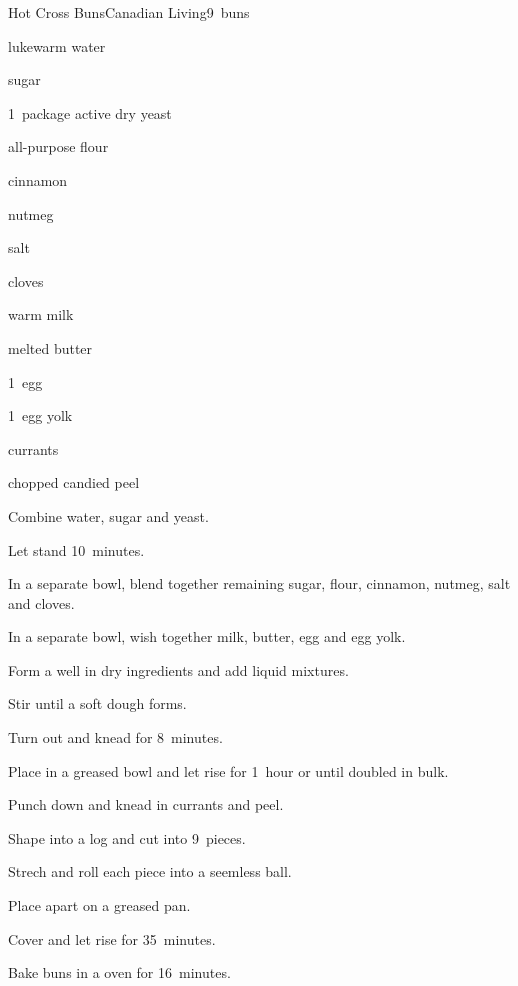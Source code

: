 \begin{recipe}{Hot Cross Buns}{Canadian Living}{9~buns}

\begin{ingredients}
\item \C{\quarter} lukewarm water
\item \C{\half} sugar
\item 1~package active dry yeast
\item \C{3\half} all-purpose flour
\item {} cinnamon
\item {} nutmeg
\item \tp{\half} salt
\item \tp{\quarter} cloves
\item \C{\threequarter} warm milk
\item \C{\quarter} melted butter
\item 1~egg
\item 1~egg yolk
\item \C{\half} currants
\item \C{\quarter} chopped candied peel
\end{ingredients}

\begin{directions}
\item Combine water,  sugar and yeast.
\item Let stand 10~minutes.
\item In a separate bowl, blend together remaining sugar, flour, cinnamon, nutmeg, salt and cloves.
\item In a separate bowl, wish together milk, butter, egg and egg yolk.
\item Form a well in dry ingredients and add liquid mixtures.
\item Stir until a soft dough forms.
\item Turn out and knead for 8~minutes.
\item Place in a greased bowl and let rise for 1~hour or until doubled in bulk.
\item Punch down and knead in currants and peel.
\item Shape into a  log and cut into 9~pieces.
\item Strech and roll each piece into a seemless ball.
\item Place  apart on a greased pan.
\item Cover and let rise for 35~minutes.
\item Bake buns in a  oven for 16~minutes.
\end{directions}


\end{recipe}
